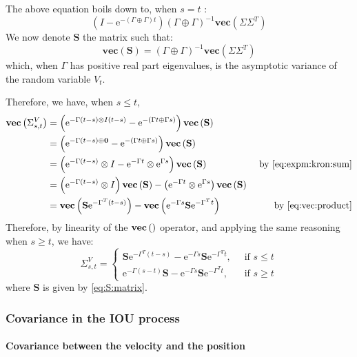 \documentclass[10pt,a4paper]{article}
\newcommand{\e}{\text{e}}
\newcommand{\inv}{^{-1}}
\newcommand{\GpG}{\left( \Gamma \oplus \Gamma \right)}
\newcommand{\Vect}[1]{\textbf{vec}\left(#1 \right)}
\newcommand{\Sinf}{\mathbf{S}}
\begin{document}
The above equation boils down to,  when $s=t$ :
$$\left(I - \e^{-(\Gamma  \oplus \Gamma) t} \right) \GpG\inv\Vect{\Sigma \Sigma^T} $$
We now denote $\Sinf$ the matrix such that:
\begin{equation}
\Vect{\Sinf} = \GpG\inv\Vect{\Sigma \Sigma^T} \label{eq:S:matrix}
\end{equation}
which, when $\Gamma$ has positive real part eigenvalues, is the asymptotic variance of the random variable $V_t$.

Therefore, we have, when $s\leq t$,
\begin{align*}
\Vect{\Sigma_{s,t}^V} &= \left( \e^{- \Gamma(t-s) \otimes I (t - s)} - \e^{-(\Gamma t \oplus \Gamma s)} \right) \Vect{\Sinf}& \\
&=\left( \e^{- \Gamma(t-s) \oplus \mathbf{0}} - \e^{-(\Gamma t \oplus \Gamma s)} \right) \Vect{\Sinf}&\\
&=\left( \e^{- \Gamma(t-s)} \otimes I - \e^{-\Gamma t} \otimes \e^{\Gamma s} \right) \Vect{\Sinf} & \text { by \eqref{eq:expm:kron:sum}}\\
&=\left( \e^{- \Gamma(t-s)} \otimes I\right)\Vect{\Sinf} - \left(\e^{-\Gamma t} \otimes \e^{\Gamma s} \right)\Vect{\Sinf}  & \\
&=\Vect{\Sinf\e^{-\Gamma^T (t - s)}} -\Vect{\e^{-\Gamma s}\Sinf \e^{-\Gamma^T t}} & \text{ by \eqref{eq:vec:product}}\\
\end{align*}
Therefore, by linearity of the $\Vect{\hbox{}}$ operator, and applying the same reasoning when $s\geq t$, we have:
\begin{equation}
\Sigma_{s,t}^V =  \left\lbrace \begin{array}{lr}
 \Sinf\e^{-\Gamma^T (t - s)} -\e^{-\Gamma s}\Sinf \e^{-\Gamma^T t},& ~\text{ if } s \leq t \\
 \e^{-\Gamma (s - t)}\Sinf -\e^{-\Gamma s}\Sinf \e^{-\Gamma^T t},&~\text{ if } s \geq t
\end{array}\right.
\label{eq:OU:cov:matrix}
\end{equation}
where $\Sinf$ is given by \eqref{eq:S:matrix}.

\subsubsection{Covariance in the IOU process}

\paragraph{Covariance between the velocity and the position}
\end{document}
